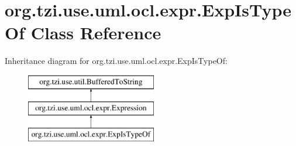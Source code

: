 \hypertarget{classorg_1_1tzi_1_1use_1_1uml_1_1ocl_1_1expr_1_1_exp_is_type_of}{\section{org.\-tzi.\-use.\-uml.\-ocl.\-expr.\-Exp\-Is\-Type\-Of Class Reference}
\label{classorg_1_1tzi_1_1use_1_1uml_1_1ocl_1_1expr_1_1_exp_is_type_of}
}
Inheritance diagram for org.\-tzi.\-use.\-uml.\-ocl.\-expr.\-Exp\-Is\-Type\-Of\-:\begin{figure}[H]
\begin{center}
\leavevmode
\includegraphics[height=3.000000cm]{classorg_1_1tzi_1_1use_1_1uml_1_1ocl_1_1expr_1_1_exp_is_type_of}
\end{center}
\end{figure}
